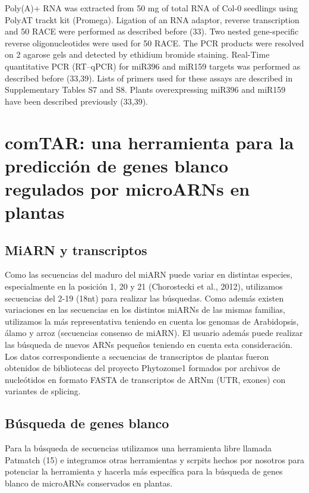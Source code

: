Poly(A)+ RNA was extracted from 50 mg of total RNA of
Col-0 seedlings using PolyAT trackt kit (Promega).
Ligation of an RNA adaptor, reverse transcription and
50 RACE were performed as described before (33). Two
nested gene-specific reverse oligonucleotides were used for
50 RACE. The PCR products were resolved on 2%
agarose gels and detected by ethidium bromide staining.
Real-Time quantitative PCR (RT–qPCR) for miR396 and
miR159 targets was performed as described before (33,39).
Lists of primers used for these assays are described in
Supplementary Tables S7 and S8. Plants overexpressing
miR396 and miR159 have been described previously
(33,39).



\section{comTAR: una herramienta para la predicción de genes blanco regulados por microARNs en plantas}

\subsection{MiARN y transcriptos}
Como las secuencias del maduro del miARN puede variar en distintas especies, especialmente en la posición 1, 20 y 21 (Chorostecki et al., 2012), utilizamos secuencias del 2-19 (18nt) para realizar las búsquedas.
Como además existen variaciones en las secuencias en los distintos miARNs de las mismas familias, utilizamos la más representativa teniendo en cuenta los genomas de Arabidopsis, álamo y arroz (secuencias consenso de miARN).
El usuario además puede realizar las búsqueda de nuevos ARNs pequeños teniendo en cuenta esta consideración.
Los datos correspondiente a secuencias de transcriptos de plantas fueron obtenidos de bibliotecas del proyecto Phytozome1 formados por archivos de nucleótidos en formato FASTA de transcriptos de ARNm (UTR, exones) con variantes de splicing.

\subsection{Búsqueda de genes blanco}
Para la búsqueda de secuencias utilizamos una herramienta libre llamada Patmatch (15) e integramos otras herramientas y scrpits hechos por nosotros para potenciar la herramienta y hacerla más específica para la búsqueda de genes blanco de microARNs conservados en plantas.

